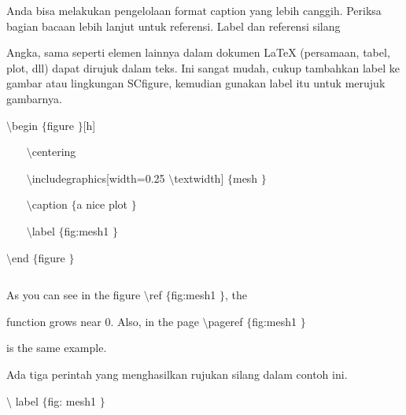 \noindent 
Anda bisa melakukan pengelolaan format caption yang lebih canggih. Periksa bagian bacaan lebih lanjut untuk referensi. Label dan referensi silang \par
\vspace{12pt}
\noindent 
Angka, sama seperti elemen lainnya dalam dokumen LaTeX (persamaan, tabel, plot, dll) dapat dirujuk dalam teks. Ini sangat mudah, cukup tambahkan label ke gambar atau lingkungan SCfigure, kemudian gunakan label itu untuk merujuk gambarnya. \par
\vspace{20pt}
\vspace{24pt}
\noindent 
 $  \setminus $begin $  \{  $figure $  \}  $[h] \par
\vspace{12pt}
\noindent 
~~~  $  \setminus $centering \par
\vspace{12pt}
\noindent 
~~~  $  \setminus $includegraphics[width=0.25 $  \setminus $textwidth] $  \{  $mesh $  \}  $ \par
\vspace{12pt}
\noindent 
~~~  $  \setminus $caption $  \{  $a nice plot $  \}  $ \par
\vspace{12pt}
\noindent 
~~~  $  \setminus $label $  \{  $fig:mesh1 $  \}  $ \par
\vspace{12pt}
\noindent 
 $  \setminus $end $  \{  $figure $  \}  $ \par
\noindent 
 $  $ \par
\noindent 
As you can see in the figure  $  \setminus $ref $  \{  $fig:mesh1 $  \}  $, the  \par
\vspace{12pt}
\noindent 
function grows near 0. Also, in the page  $  \setminus $pageref $  \{  $fig:mesh1 $  \}  $  \par
\vspace{12pt}
\noindent 
is the same example. \par
\vspace{12pt}
\vspace{12pt}
\vspace{12pt}
\vspace{12pt}
\vspace{12pt}
\noindent 
Ada tiga perintah yang menghasilkan rujukan silang dalam contoh ini. \par
\vspace{12pt}
\noindent 
 $  \setminus $ label  $  \{  $fig: mesh1 $  \}  $ \par
